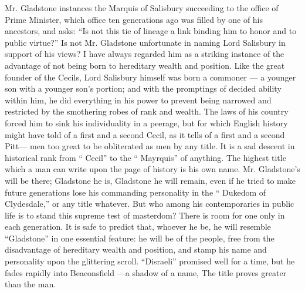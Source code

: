 \documentclass[11pt,openany]{book}
\begin{document}
Mr. Gladstone instances the Marquis of Salisbury succeeding to the office of Prime Minister, which office ten generations ago was filled by one of his ancestors, and asks: ``Is not this tie of lineage a link binding him to honor and to public virtue?'' Is not Mr. Gladstone unfortunate in naming Lord Salisbury in support of his views? I have always regarded him as a striking instance of the advantage of not being born to hereditary wealth and position. Like the great founder of the Cecils, Lord Salisbury himself was born a commoner --- a younger son with a younger son's portion; and with the promptings of decided ability within him, he did everything in his power to prevent being narrowed and restricted by the smothering robes of rank and wealth. The laws of his country forced him to sink his individuality in a peerage, but for which English history might have told of a first and a second Cecil, as it tells of a first and a second Pitt--- men too great to be obliterated as men by any title. It is a sad descent in historical rank from `` Cecil'' to the `` Mayrquis'' of anything. The highest title which a man can write upon the page of history is his own name. Mr. Gladstone's will be there; Gladstone he is, Gladstone he will remain, even if he tried to make future generations lose his commanding personality in the `` Dukedom of Clydesdale,'' or any title whatever. But who among his contemporaries in public life is to stand this supreme test of masterdom? There is room for one only in each generation. It is safe to predict that, whoever he be, he will resemble ``Gladstone'' in one essential feature: he will be of the people, free from the disadvantage of hereditary wealth and position, and stamp his name and personality upon the glittering scroll. ``Disraeli'' promised well for a time, but he fades rapidly into Beaconsfield ---a shadow of a name, The title proves greater than the man.
\end{document}
